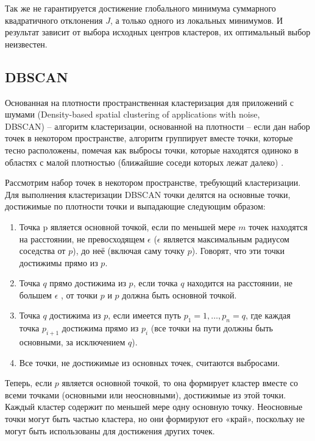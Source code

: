 \documentclass[bachelor, och, referat]{SCWorks}
\begin{document}
Так же не гарантируется достижение глобального минимума суммарного квадратичного отклонения $J$, а только одного из локальных минимумов. И результат зависит от выбора исходных центров кластеров, их оптимальный выбор неизвестен.

\subsection{DBSCAN}
Основанная на плотности пространственная кластеризация для приложений с шумами (Density-based spatial clustering of applications with noise, \\DBSCAN) -- алгоритм кластеризации, основанной на плотности -- если дан набор точек в некотором пространстве, алгоритм группирует вместе точки, которые тесно расположены, помечая как выбросы точки, которые находятся одиноко в областях с малой плотностью (ближайшие соседи которых лежат далеко) \cite{dbscan}.

Рассмотрим набор точек в некотором пространстве, требующий кластеризации. Для выполнения кластеризации DBSCAN точки делятся на основные точки, достижимые по плотности точки и выпадающие следующим образом:
\begin{enumerate}
    \item Точка p является основной точкой, если по меньшей мере $m$ точек находятся на расстоянии, не превосходящем 
    $\epsilon$  ($\epsilon$ является максимальным радиусом соседства от $p$), до неё (включая саму точку $p$). Говорят, что эти точки достижимы прямо из $p$.

    \item Точка $q$ прямо достижима из $p$, если точка $q$ находится на расстоянии, не большем 
    $\epsilon$ , от точки $p$ и $p$ должна быть основной точкой.

    \item Точка $q$ достижима из $p$, если имеется путь $p_1 = 1, \dots, p_n = q$, где
    каждая точка $p_{i + 1}$ достижима прямо из $p_i$ 
    (все точки на пути должны быть основными, за исключением $q$).

    \item Все точки, не достижимые из основных точек, считаются выбросами.
\end{enumerate}

Теперь, если $p$ является основной точкой, то она формирует кластер вместе со всеми точками (основными или неосновными), достижимые из этой точки. Каждый кластер содержит по меньшей мере одну основную точку. Неосновные точки могут быть частью кластера, но они формируют его «край», поскольку не могут быть использованы для достижения других точек.
\end{document}
